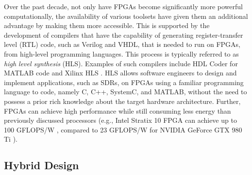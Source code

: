 Over the past decade, not only have FPGAs become significantly more powerful computationally, the availability of various toolsets have given them an additional advantage by making them more accessible. This is supported by the development of compilers that have the capability of generating register-transfer level (RTL) code, such as Verilog and VHDL, that is needed to run on FPGAs, from high-level programming languages. This process is typically referred to as \emph{high level synthesis} (HLS). Examples of such compilers include HDL Coder \cite{unknown-l} for MATLAB code \cite{matlab-a} and Xilinx HLS \cite{unknown-m}. HLS allows software engineers to design and implement applications, such as SDRs, on FPGAs using a familiar programming language to code, namely C, C++, SystemC, and MATLAB, without the need to possess a prior rich knowledge about the target hardware architecture. Further, FPGAs can achieve high performance while still consuming less energy than previously discussed processors \cite{choi2003a} (e.g., Intel Stratix 10 FPGA can achieve up to 100 GFLOPS/W \cite{altera2010a}, compared to 23 GFLOPS/W for NVIDIA GeForce GTX 980 Ti \cite{unknown-g}).

\subsection{Hybrid Design}

